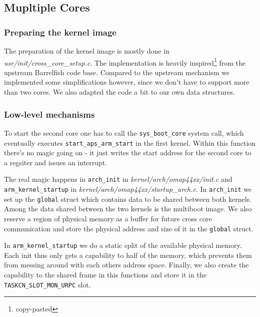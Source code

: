 \documentclass[a4paper,10pt]{article}
\newcommand{\filepath}[1]{\emph{ #1}}
\begin{document}
\subsection{Mupltiple Cores}

\subsubsection{Preparing the kernel image}

The preparation of the kernel image is mostly done in \filepath{usr/init/cross\_core\_setup.c}.
The implementation is heavily inspired\footnote{copy-pasted} from the upstream Barrelfish code base.
Compared to the upstream mechanism we implemented some simplifications however, since we don't have to support more than two cores.
We also adapted the code a bit to our own data structures.

\subsubsection{Low-level mechanisms}

To start the second core one has to call the \lstinline!sys_boot_core! system call, which eventually executes \lstinline!start_aps_arm_start! in the first kernel.
Within this function there's no magic going on - it just writes the start address for the second core to a regsiter and issues an interrupt.

The real magic happens in \lstinline!arch_init! in \filepath{kernel/arch/omap44xx/init.c} and  \lstinline{arm_kernel_startup} in \filepath{kernel/arch/omap44xx/startup\_arch.c}.
In \lstinline!arch_init! we set up the \lstinline!global! struct which contains data to be shared between both kernels.
Among the data shared between the two kernels is the multiboot image.
We also reserve a region of physical memory as a buffer for future cross core communication and store the physical address and size of it in the \lstinline!global! struct.

In \lstinline!arm_kernel_startup! we do a static split of the available physical memory.
Each init thus only gets a capability to half of the memory, which prevents them from messing around with each others address space.
Finally, we also create the capability to the shared frame in this functions and store it in the \lstinline!TASKCN_SLOT_MON_URPC! slot.
\end{document}
